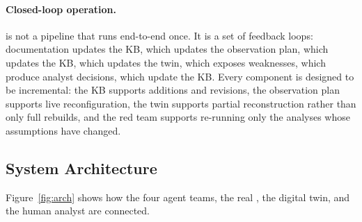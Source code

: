 \paragraph{Closed-loop operation.}
\sysname is not a pipeline that runs end-to-end once. It is a set of
feedback loops: documentation updates the KB, which updates the
observation plan, which updates the KB, which updates the twin, which
exposes weaknesses, which produce analyst decisions, which update the
KB. Every component is designed to be incremental: the KB supports
additions and revisions, the observation plan supports live
reconfiguration, the twin supports partial reconstruction rather than
only full rebuilds, and the red team supports re-running only the
analyses whose assumptions have changed.

\subsection{System Architecture}
\label{sec:approach-arch}

Figure~\ref{fig:arch} shows how the four agent teams, the real \cps,
the digital twin, and the human analyst are connected.

